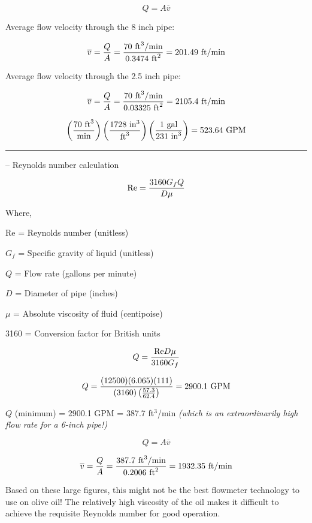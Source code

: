 $$Q = A \overline{v}$$

Average flow velocity through the 8 inch pipe:

$$\overline{v} = {Q \over A} = {70 \hbox{ ft}^3/\hbox{min} \over 0.3474 \hbox{ ft}^2} = 201.49 \hbox{ ft/min}$$

\vskip 10pt

Average flow velocity through the 2.5 inch pipe:

$$\overline{v} = {Q \over A} = {70 \hbox{ ft}^3/\hbox{min} \over 0.03325 \hbox{ ft}^2} = 2105.4 \hbox{ ft/min}$$

\vskip 10pt

$$\left({70 \hbox{ ft}^3 \over \hbox{min}}\right) \left({1728 \hbox{ in}^3 \over \hbox{ft}^3}\right) \left({1 \hbox{ gal} \over 231 \hbox{ in}^3} \right) = 523.64 \hbox{ GPM}$$


\filbreak \vskip 5pt \hrule \vskip 5pt  -- Reynolds number calculation \vskip 10pt

$$\hbox{Re} = {{3160 G_f Q} \over {D \mu}}$$

\noindent
Where,

Re = Reynolds number (unitless)

$G_f$ = Specific gravity of liquid (unitless)

$Q$ = Flow rate (gallons per minute)

$D$ = Diameter of pipe (inches)

$\mu$ = Absolute viscosity of fluid (centipoise)

3160 = Conversion factor for British units

\vskip 10pt


$$Q = {\hbox{Re} D \mu \over 3160 G_f}$$

$$Q = {(12500) (6.065) (111) \over (3160) \left(57.3 \over 62.4\right)} = 2900.1 \hbox{ GPM}$$

$Q$ (minimum) = 2900.1 GPM = 387.7 ft$^{3}$/min {\it (which is an extraordinarily high flow rate for a 6-inch pipe!)}

\vskip 10pt

$$Q = A \overline{v}$$

$$\overline{v} = {Q \over A} = {387.7 \hbox{ ft}^3\hbox{/min} \over 0.2006 \hbox{ ft}^2} = 1932.35 \hbox{ ft/min}$$

\vskip 10pt

Based on these large figures, this might not be the best flowmeter technology to use on olive oil!  The relatively high viscosity of the oil makes it difficult to achieve the requisite Reynolds number for good operation.



